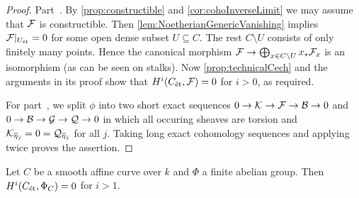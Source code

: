 \begin{proof}
	Part~. By \cref{prop:constructible} and \cref{cor:cohoInverseLimit} we may assume that $\mathcal{F}$ is constructible. Then \cref{lem:NoetherianGenericVanishing} implies $\mathcal{F}|_{U_{\mathrm{\acute{e}t}}}=0$ for some open dense subset $U\subseteq C$. The rest $C\setminus U$ consists of only finitely many points. Hence the canonical morphism $\Ff\morphism\bigoplus_{x\in C\setminus U}x_*\Ff_x$ is an isomorphism (as can be seen on stalks). Now \cref{prop:technicalCech} and the arguments in its proof show that $H^i(C_{\mathrm{\acute{e}t}},\mathcal{F})=0$ for $i>0$, as required.
	
	For part~, we split $\phi$ into two short exact sequences $0\morphism \Kk\morphism \Ff\morphism \Bb\morphism 0$ and $0\morphism \Bb\morphism \Gg\morphism \Qq\morphism 0$ in which all occuring sheaves are torsion and $\Kk_{\ov{\eta}_j}=0=\Qq_{\ov{\eta}_j}$ for all $j$. Taking long exact cohomology sequences and applying  twice proves the assertion.
\end{proof}
\begin{lem}\label{lem:affineConstantSheaf}
	Let $C$ be a smooth affine curve over $k$ and $\Phi$ a finite abelian group. Then $H^i(C_{\mathrm{\acute{e}t}},\Phi_C)=0$ for $i>1$.
\end{lem}
